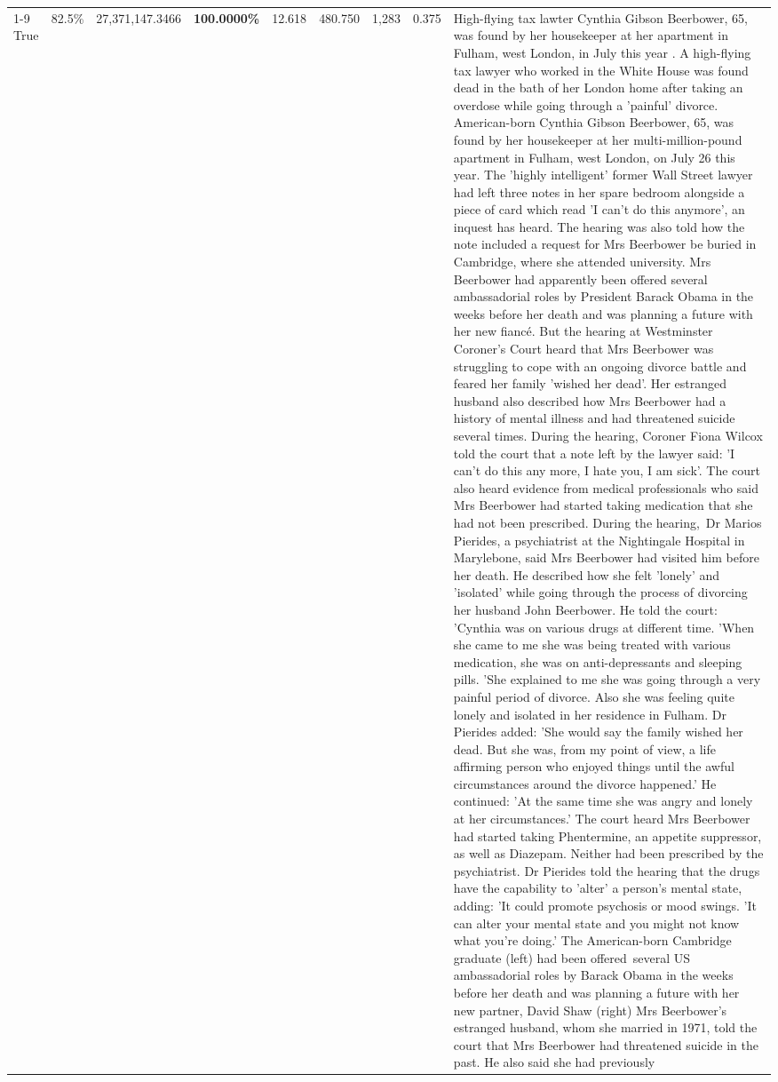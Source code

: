 \begin{table}[H]
\begin{tabular}{lllrlllll}
\cline{1-9}
True & 82.5\% & 27,371,147.3466 & \bfseries \color{red} 100.0000\% & 12.618 & 480.750 & 1,283 & 0.375 & High-flying tax lawter Cynthia Gibson Beerbower, 65, was found by her housekeeper at her apartment in Fulham, west London, in July this year . A high-flying tax lawyer who worked in the White House was found dead in the bath of her London home after taking an overdose while going through a 'painful' divorce. American-born Cynthia Gibson Beerbower, 65, was found by her housekeeper at her multi-million-pound apartment in Fulham, west London, on July 26 this year. The 'highly intelligent' former Wall Street lawyer had left three notes in her spare bedroom alongside a piece of card which read 'I can't do this anymore', an inquest has heard. The hearing was also told how the note included a request for Mrs Beerbower be buried in Cambridge, where she attended university. Mrs Beerbower had apparently been offered several ambassadorial roles by President Barack Obama in the weeks before her death and was planning a future with her new fiancé. But the hearing at Westminster Coroner's Court heard that Mrs Beerbower was struggling to cope with an ongoing divorce battle and feared her family 'wished her dead'. Her estranged husband also described how Mrs Beerbower had a history of mental illness and had threatened suicide several times. During the hearing, Coroner Fiona Wilcox told the court that a note left by the lawyer said: 'I can't do this any more, I hate you, I am sick'. The court also heard evidence from medical professionals who said Mrs Beerbower had started taking medication that she had not been prescribed. During the hearing, Dr Marios Pierides, a psychiatrist at the Nightingale Hospital in Marylebone, said Mrs Beerbower had visited him before her death. He described how she felt 'lonely' and 'isolated' while going through the process of divorcing her husband John Beerbower. He told the court: 'Cynthia was on various drugs at different time. 'When she came to me she was being treated with various medication, she was on anti-depressants and sleeping pills. 'She explained to me she was going through a very painful period of divorce. Also she was feeling quite lonely and isolated in her residence in Fulham. Dr Pierides added: 'She would say the family wished her dead. But she was, from my point of view, a life affirming person who enjoyed things until the awful circumstances around the divorce happened.' He continued: 'At the same time she was angry and lonely at her circumstances.' The court heard Mrs Beerbower had started taking Phentermine, an appetite suppressor, as well as Diazepam. Neither had been prescribed by the psychiatrist. Dr Pierides told the hearing that the drugs have the capability to 'alter' a person's mental state, adding: 'It could promote psychosis or mood swings. 'It can alter your mental state and you might not know what you're doing.' The American-born Cambridge graduate (left) had been offered several US ambassadorial roles by Barack Obama in the weeks before her death and was planning a future with her new partner, David Shaw (right) Mrs Beerbower's estranged husband, whom she married in 1971, told the court that Mrs Beerbower had threatened suicide in the past. He also said she had previously 
\end{tabular}
\end{table}
